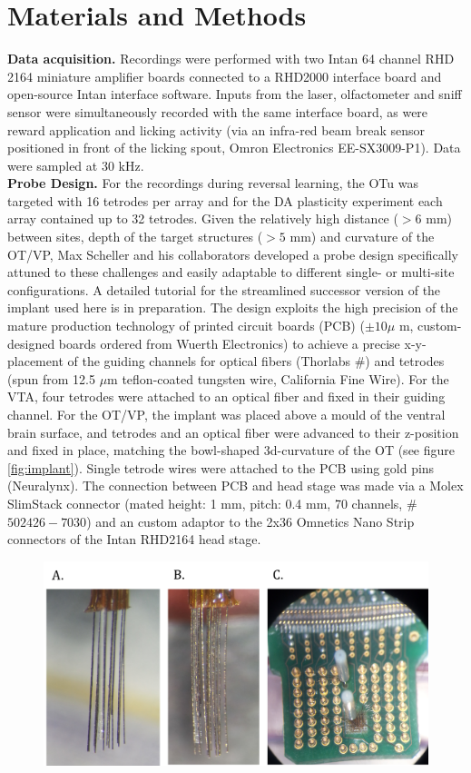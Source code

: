 \section{Materials and Methods}
\label{sec:MatAndMet}
\begin{framed}
\textbf{Data acquisition.} Recordings were performed with two Intan 64 channel RHD 2164 miniature amplifier boards connected to a RHD2000 interface board and open-source Intan interface software. Inputs from the laser, olfactometer and sniff sensor were simultaneously recorded with the same interface board, as were reward application and licking activity (via an infra-red beam break sensor positioned in front of the licking spout, Omron Electronics EE-SX3009-P1). Data were sampled at 30 kHz.\\\textbf{Probe Design.} For the recordings during reversal learning, the OTu was targeted with 16 tetrodes per array and for the DA plasticity experiment each array contained up to 32 tetrodes. Given the relatively high distance ($>6$ mm) between sites, depth of the target structures ($>5$ mm) and curvature of the OT/VP, Max Scheller and his collaborators developed a probe design specifically attuned to these challenges and easily adaptable to different single- or multi-site configurations. A detailed tutorial for the streamlined successor version of the implant used here is in preparation. The design exploits the high precision of the mature production technology of printed circuit boards (PCB)  ($\pm10\mu$ m, custom-designed boards ordered from Wuerth Electronics) to achieve a precise x-y-placement of the guiding channels for optical fibers (Thorlabs \#) and tetrodes (spun from 12.5 $\mu$m teflon-coated tungsten wire, California Fine Wire). For the VTA, four tetrodes were attached to an optical fiber and fixed in their guiding channel. For the OT/VP, the implant was placed above a mould of the ventral brain surface, and tetrodes and an optical fiber were advanced to their z-position and fixed in place, matching the bowl-shaped 3d-curvature of the OT (see figure \ref{fig:implant}). Single tetrode wires were attached to the PCB using gold pins (Neuralynx). The connection between PCB and head stage was made via a Molex SlimStack connector (mated height: 1 mm, pitch: 0.4 mm, 70 channels, \# $502426-7030$) and an custom adaptor to the 2x36 Omnetics Nano Strip connectors of the Intan RHD2164 head stage.\\ 
\begin{figure}[H]
    \centering
    \includegraphics[scale=0.4]{figures/Implant.png}

\end{figure}
\end{framed}
